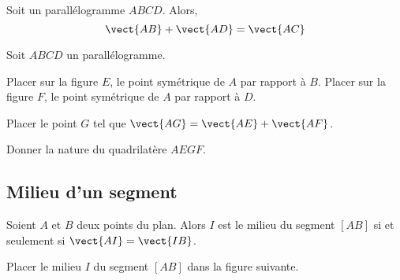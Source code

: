\documentclass{article}
\begin{document}
\begin{proposition}
Soit un parallélogramme $ABCD$. Alors,
\begin{equation*}
\vect{AB} + \vect{AD} = \vect{AC}
\end{equation*}
\end{proposition}

\begin{example}
Soit $ABCD$ un parallélogramme.
\begin{center}
\end{center}
\begin{enumquestions}
\item Placer sur la figure $E$, le point symétrique de $A$ par rapport à $B$. Placer sur la figure $F$, le point symétrique de $A$ par rapport à $D$.
\item Placer le point $G$ tel que $\vect{AG} = \vect{AE} + \vect{AF}$.
\item Donner la nature du quadrilatère $AEGF$.
\end{enumquestions}
\emptybox{6cm}
\end{example}

\newpage
\subsection{Milieu d'un segment}

\begin{proposition}
Soient $A$ et $B$ deux points du plan. Alors $I$ est le milieu du segment $[AB]$ si et seulement si $\vect{AI} = \vect{IB}$.
\end{proposition}

\begin{example}
\hfill
\begin{center}
\end{center}
\end{example}

\begin{example}
Placer le milieu $I$ du segment $[AB]$ dans la figure suivante.
\begin{center}
\end{center}
\end{example}
\end{document}
